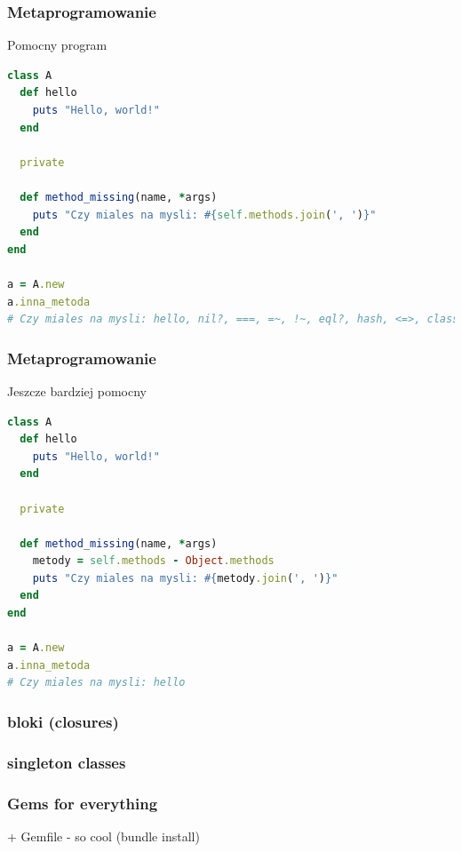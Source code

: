 \begin{frame}[fragile]
\frametitle{Metaprogramowanie}
\begin{block}{Pomocny program}
\begin{lstlisting}[language=Ruby,basicstyle=\tiny\ttfamily]
class A
  def hello
    puts "Hello, world!"
  end

  private

  def method_missing(name, *args)
    puts "Czy miales na mysli: #{self.methods.join(', ')}"
  end
end

a = A.new
a.inna_metoda
# Czy miales na mysli: hello, nil?, ===, =~, !~, eql?, hash, <=>, class, singleton_class, clone, dup, taint, tainted?, untaint, untrust, untrusted?, trust, freeze, frozen?, to_s, inspect, methods, singleton_methods, protected_methods, private_methods, public_methods, instance_variables, instance_variable_get, instance_variable_set, instance_variable_defined?, remove_instance_variable, instance_of?, kind_of?, is_a?, tap, send, public_send, respond_to?, extend, display, method, public_method, singleton_method, define_singleton_method, object_id, to_enum, enum_for, ==, equal?, !, !=, instance_eval, instance_exec, __send__, __id__
\end{lstlisting}
\end{block}
\end{frame}
\begin{frame}[fragile]
\frametitle{Metaprogramowanie}
\begin{block}{Jeszcze bardziej pomocny}
\begin{lstlisting}[language=Ruby,basicstyle=\tiny\ttfamily]
class A
  def hello
    puts "Hello, world!"
  end

  private

  def method_missing(name, *args)
    metody = self.methods - Object.methods
    puts "Czy miales na mysli: #{metody.join(', ')}"
  end
end

a = A.new
a.inna_metoda
# Czy miales na mysli: hello
\end{lstlisting}
\end{block}
\end{frame}


\begin{frame}[fragile]
\frametitle{bloki (closures)}
\end{frame}

\begin{frame}[fragile]
\frametitle{singleton classes}
\end{frame}

\begin{frame}[fragile]
\frametitle{Gems for everything}
 + Gemfile - so cool (bundle install)
\end{frame}


